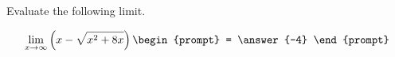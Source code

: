\documentclass{ximera}
\author{Steven Gubkin}
\begin{document}
\begin{exercise}

Evaluate the following limit.

\[
\lim_{x \to \infty} \left(x - \sqrt{x^2+8x}\right) \begin{prompt} = \answer{-4} \end{prompt}
\]

\end{exercise}
\end{document}
